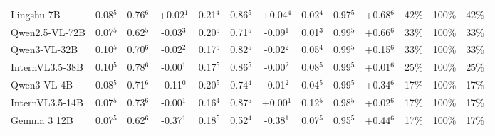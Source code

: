 \documentclass[11pt]{article}
\begin{document}
\begin{table}[t]
{\begin{tabular}{l@{\hspace{3pt}}ccc@{\hspace{4pt}}ccc@{\hspace{4pt}}ccc@{\hspace{4pt}}ccc}
Lingshu 7B & \cellcolor{cfSage2}0.08$^{5}$ & \cellcolor{cfSage3}0.76$^{6}$ & \cellcolor{cfTerra2}+0.02$^{1}$ & \cellcolor{cfSage4}0.21$^{4}$ & \cellcolor{cfSage3}0.86$^{5}$ & \cellcolor{cfTerra2}+0.04$^{4}$ & \cellcolor{cfSage1}0.02$^{4}$ & \cellcolor{cfSage4}0.97$^{5}$ & \cellcolor{cfTerra4}+0.68$^{6}$ & \cellcolor{cfTerra4}42\% & \cellcolor{cfTerra4}100\% & 42\% \\
Qwen2.5-VL-72B & \cellcolor{cfSage2}0.07$^{5}$ & \cellcolor{cfSage2}0.62$^{5}$ & \cellcolor{cfSlate2}-0.03$^{3}$ & \cellcolor{cfSage3}0.20$^{5}$ & \cellcolor{cfSage2}0.71$^{5}$ & \cellcolor{cfSlate2}-0.09$^{1}$ & \cellcolor{cfSage1}0.01$^{3}$ & \cellcolor{cfSage4}0.99$^{5}$ & \cellcolor{cfTerra4}+0.66$^{6}$ & \cellcolor{cfTerra3}33\% & \cellcolor{cfTerra4}100\% & 33\% \\
Qwen3-VL-32B & \cellcolor{cfSage2}0.10$^{5}$ & \cellcolor{cfSage2}0.70$^{6}$ & \cellcolor{cfSlate2}-0.02$^{2}$ & \cellcolor{cfSage3}0.17$^{5}$ & \cellcolor{cfSage3}0.82$^{5}$ & \cellcolor{cfSlate2}-0.02$^{2}$ & \cellcolor{cfSage2}0.05$^{4}$ & \cellcolor{cfSage4}0.99$^{5}$ & \cellcolor{cfTerra3}+0.15$^{6}$ & \cellcolor{cfTerra3}33\% & \cellcolor{cfTerra4}100\% & 33\% \\
InternVL3.5-38B & \cellcolor{cfSage2}0.10$^{5}$ & \cellcolor{cfSage3}0.78$^{6}$ & \cellcolor{cfSlate1}-0.00$^{1}$ & \cellcolor{cfSage3}0.17$^{5}$ & \cellcolor{cfSage3}0.86$^{5}$ & \cellcolor{cfSlate1}-0.00$^{2}$ & \cellcolor{cfSage2}0.08$^{5}$ & \cellcolor{cfSage4}0.99$^{5}$ & \cellcolor{cfTerra1}+0.01$^{6}$ & \cellcolor{cfTerra3}25\% & \cellcolor{cfTerra4}100\% & 25\% \\
Qwen3-VL-4B & \cellcolor{cfSage2}0.08$^{5}$ & \cellcolor{cfSage2}0.71$^{6}$ & \cellcolor{cfSlate3}-0.11$^{0}$ & \cellcolor{cfSage4}0.20$^{5}$ & \cellcolor{cfSage2}0.74$^{4}$ & \cellcolor{cfSlate1}-0.01$^{2}$ & \cellcolor{cfSage1}0.04$^{5}$ & \cellcolor{cfSage4}0.99$^{5}$ & \cellcolor{cfTerra4}+0.34$^{6}$ & \cellcolor{cfTerra3}17\% & \cellcolor{cfTerra4}100\% & 17\% \\
InternVL3.5-14B & \cellcolor{cfSage2}0.07$^{5}$ & \cellcolor{cfSage2}0.73$^{6}$ & \cellcolor{cfSlate1}-0.00$^{1}$ & \cellcolor{cfSage3}0.16$^{4}$ & \cellcolor{cfSage3}0.87$^{5}$ & \cellcolor{cfTerra1}+0.00$^{1}$ & \cellcolor{cfSage3}0.12$^{5}$ & \cellcolor{cfSage4}0.98$^{5}$ & \cellcolor{cfTerra1}+0.02$^{6}$ & \cellcolor{cfTerra3}17\% & \cellcolor{cfTerra4}100\% & 17\% \\
Gemma 3 12B & \cellcolor{cfSage2}0.07$^{5}$ & \cellcolor{cfSage2}0.62$^{6}$ & \cellcolor{cfSlate4}-0.37$^{1}$ & \cellcolor{cfSage3}0.18$^{5}$ & \cellcolor{cfSage1}0.52$^{4}$ & \cellcolor{cfSlate4}-0.38$^{1}$ & \cellcolor{cfSage2}0.07$^{5}$ & \cellcolor{cfSage4}0.95$^{5}$ & \cellcolor{cfTerra4}+0.44$^{6}$ & \cellcolor{cfTerra3}17\% & \cellcolor{cfTerra4}100\% & 17\% \\

\end{tabular}}
\end{table}
\end{document}
